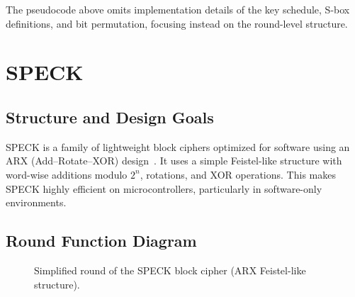 \documentclass[12pt]{report}
\begin{document}
The pseudocode above omits implementation details of the key schedule, S-box definitions, and bit
permutation, focusing instead on the round-level structure.

\section{SPECK}

\subsection*{Structure and Design Goals}

SPECK is a family of lightweight block ciphers optimized for software using an ARX
(Add–Rotate–XOR) design~\cite{beaulieu2015simon}. It uses a simple Feistel-like structure
with word-wise additions modulo $2^n$, rotations, and XOR operations. This makes SPECK
highly efficient on microcontrollers, particularly in software-only environments.

\subsection*{Round Function Diagram}

\begin{figure}[H]
    \centering
    \caption{Simplified round of the SPECK block cipher (ARX Feistel-like structure).}
    \label{fig:speck-round}
\end{figure}
\end{document}
